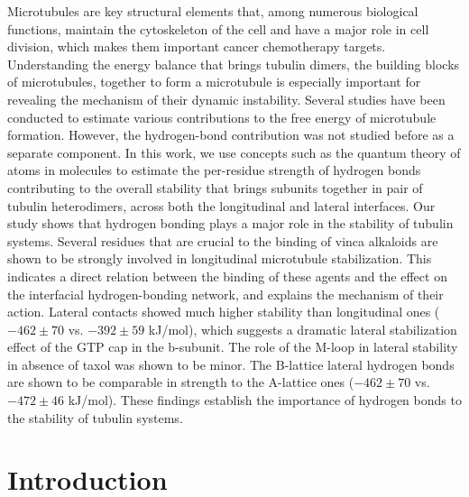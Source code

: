 \documentclass[11pt]{report}
\begin{document}
Microtubules are key structural elements that, among numerous biological functions, maintain the cytoskeleton of
the cell and have a major role in cell division, which makes them important cancer chemotherapy targets. Understanding the
energy balance that brings tubulin dimers, the building blocks of microtubules, together to form a microtubule is especially important for revealing the mechanism of their dynamic instability. Several studies have been conducted to estimate various contributions to the free energy of microtubule formation. However, the hydrogen-bond contribution was not studied before as a
separate component. In this work, we use concepts such as the quantum theory of atoms in molecules to estimate the
per-residue strength of hydrogen bonds contributing to the overall stability that brings subunits together in pair of tubulin heterodimers, across both the longitudinal and lateral interfaces. Our study shows that hydrogen bonding plays a major role in the stability of tubulin systems. Several residues that are crucial to the binding of vinca alkaloids are shown to be strongly involved in
longitudinal microtubule stabilization. This indicates a direct relation between the binding of these agents and the effect on the
interfacial hydrogen-bonding network, and explains the mechanism of their action. Lateral contacts showed much higher stability
than longitudinal ones ($-462\pm70$ vs. $-392\pm59$ kJ/mol), which suggests a dramatic lateral stabilization effect of the GTP cap in
the b-subunit. The role of the M-loop in lateral stability in absence of taxol was shown to be minor. The B-lattice lateral hydrogen
bonds are shown to be comparable in strength to the A-lattice ones ($-462\pm70$ vs. $-472\pm46$ kJ/mol). These findings establish
the importance of hydrogen bonds to the stability of tubulin systems.


\section{Introduction}
\end{document}
